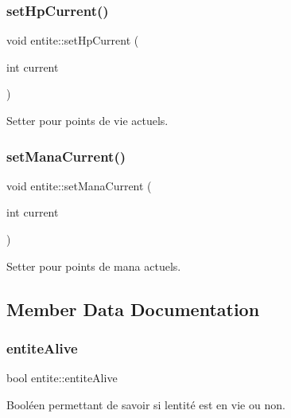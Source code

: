 \subsubsection{\texorpdfstring{set\+Hp\+Current()}{setHpCurrent()}}
{\footnotesize\ttfamily void entite\+::set\+Hp\+Current (\begin{DoxyParamCaption}\item[{int}]{current }\end{DoxyParamCaption})}



Setter pour points de vie actuels. 

\mbox{\label{classentite_a33be38cbd4590fd55c5338a749ed4c06}} 
\subsubsection{\texorpdfstring{set\+Mana\+Current()}{setManaCurrent()}}
{\footnotesize\ttfamily void entite\+::set\+Mana\+Current (\begin{DoxyParamCaption}\item[{int}]{current }\end{DoxyParamCaption})}



Setter pour points de mana actuels. 



\subsection{Member Data Documentation}
\mbox{\label{classentite_a5a69c21a4435817f2d960e0811d4474e}} 
\subsubsection{\texorpdfstring{entite\+Alive}{entiteAlive}}
{\footnotesize\ttfamily bool entite\+::entite\+Alive\hspace{0.3cm}{\ttfamily [protected]}}



Booléen permettant de savoir si l\textquotesingle{}entité est en vie ou non. 

\mbox{\label{classentite_a6fab1d9a04ade2cb97ec0904b12c82c9}} 
